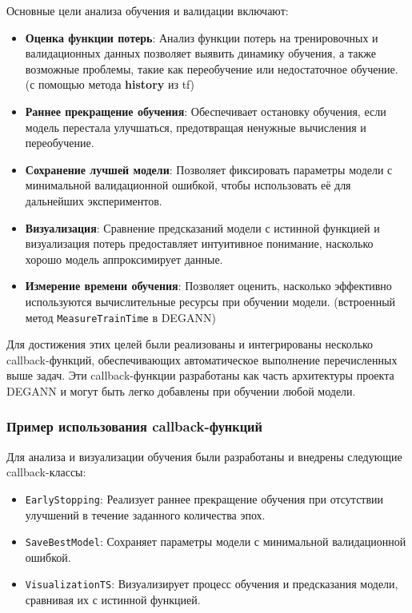 Основные цели анализа обучения и валидации включают:
\begin{itemize}
    \item \textbf{Оценка функции потерь}: Анализ функции потерь на тренировочных и валидационных данных позволяет выявить динамику обучения, а также возможные проблемы, такие как переобучение или недостаточное обучение. (с помощью метода \textbf{history} из tf)
    \item \textbf{Раннее прекращение обучения}: Обеспечивает остановку обучения, если модель перестала улучшаться, предотвращая ненужные вычисления и переобучение.
    \item \textbf{Сохранение лучшей модели}: Позволяет фиксировать параметры модели с минимальной валидационной ошибкой, чтобы использовать её для дальнейших экспериментов.
    \item \textbf{Визуализация}: Сравнение предсказаний модели с истинной функцией и визуализация потерь предоставляет интуитивное понимание, насколько хорошо модель аппроксимирует данные.
    \item \textbf{Измерение времени обучения}: Позволяет оценить, насколько эффективно используются вычислительные ресурсы при обучении модели. (встроенный метод \texttt{MeasureTrainTime} в DEGANN)
\end{itemize}

Для достижения этих целей были реализованы и интегрированы несколько callback-функций, обеспечивающих автоматическое выполнение перечисленных выше задач. Эти callback-функции разработаны как часть архитектуры проекта DEGANN и могут быть легко добавлены при обучении любой модели.


\subsubsection{Пример использования callback-функций}

Для анализа и визуализации обучения были разработаны и внедрены следующие callback-классы:
\begin{itemize}
    \item \texttt{EarlyStopping}: Реализует раннее прекращение обучения при отсутствии улучшений в течение заданного количества эпох.
    \item \texttt{SaveBestModel}: Сохраняет параметры модели с минимальной валидационной ошибкой.
    \item \texttt{VisualizationTS}: Визуализирует процесс обучения и предсказания модели, сравнивая их с истинной функцией.
\end{itemize}

